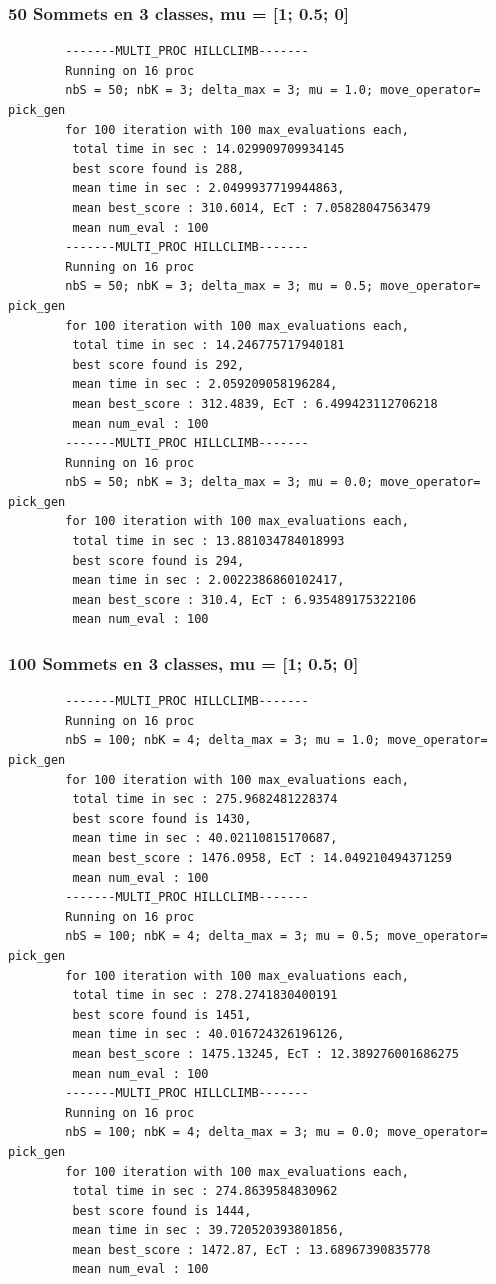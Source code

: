 \documentclass[a4paper]{article}
\begin{document}
		\subsubsection{50 Sommets en 3 classes, mu = [1; 0.5; 0]}
		\begin{verbatim}
		-------MULTI_PROC HILLCLIMB-------
		Running on 16 proc
		nbS = 50; nbK = 3; delta_max = 3; mu = 1.0; move_operator= pick_gen
		for 100 iteration with 100 max_evaluations each, 
		 total time in sec : 14.029909709934145
		 best score found is 288,
		 mean time in sec : 2.0499937719944863,
		 mean best_score : 310.6014, EcT : 7.05828047563479
		 mean num_eval : 100
		-------MULTI_PROC HILLCLIMB-------
		Running on 16 proc
		nbS = 50; nbK = 3; delta_max = 3; mu = 0.5; move_operator= pick_gen
		for 100 iteration with 100 max_evaluations each, 
		 total time in sec : 14.246775717940181
		 best score found is 292,
		 mean time in sec : 2.059209058196284,
		 mean best_score : 312.4839, EcT : 6.499423112706218
		 mean num_eval : 100
		-------MULTI_PROC HILLCLIMB-------
		Running on 16 proc
		nbS = 50; nbK = 3; delta_max = 3; mu = 0.0; move_operator= pick_gen
		for 100 iteration with 100 max_evaluations each, 
		 total time in sec : 13.881034784018993
		 best score found is 294,
		 mean time in sec : 2.0022386860102417,
		 mean best_score : 310.4, EcT : 6.935489175322106
		 mean num_eval : 100
		\end{verbatim}
		\subsubsection{100 Sommets en 3 classes, mu = [1; 0.5; 0]}
		\begin{verbatim}
		-------MULTI_PROC HILLCLIMB-------
		Running on 16 proc
		nbS = 100; nbK = 4; delta_max = 3; mu = 1.0; move_operator= pick_gen
		for 100 iteration with 100 max_evaluations each, 
		 total time in sec : 275.9682481228374
		 best score found is 1430,
		 mean time in sec : 40.02110815170687,
		 mean best_score : 1476.0958, EcT : 14.049210494371259
		 mean num_eval : 100
		-------MULTI_PROC HILLCLIMB-------
		Running on 16 proc
		nbS = 100; nbK = 4; delta_max = 3; mu = 0.5; move_operator= pick_gen
		for 100 iteration with 100 max_evaluations each, 
		 total time in sec : 278.2741830400191
		 best score found is 1451,
		 mean time in sec : 40.016724326196126,
		 mean best_score : 1475.13245, EcT : 12.389276001686275
		 mean num_eval : 100
		-------MULTI_PROC HILLCLIMB-------
		Running on 16 proc
		nbS = 100; nbK = 4; delta_max = 3; mu = 0.0; move_operator= pick_gen
		for 100 iteration with 100 max_evaluations each, 
		 total time in sec : 274.8639584830962
		 best score found is 1444,
		 mean time in sec : 39.720520393801856,
		 mean best_score : 1472.87, EcT : 13.68967390835778
		 mean num_eval : 100
		\end{verbatim}
\end{document}

